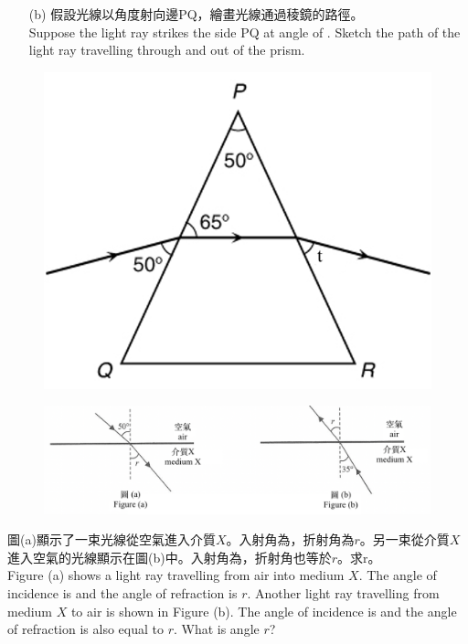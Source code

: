 \documentclass[beamer=true]{standalone}
\begin{document}
\begin{eg}
    \begin{itemize}
        \item [(b)] 假設光線以角度射向邊PQ，繪畫光線通過稜鏡的路徑。\\Suppose the light ray strikes the side PQ at angle of . Sketch the path of the light ray travelling through and out of the prism.
    \end{itemize}
    \begin{figure}
        \centering
        \includegraphics[width=0.6\linewidth]{assets/9209138209312.png}
        
        
    \end{figure}
\end{eg}

\begin{eg}
    \begin{figure}
        \centering
        \includegraphics[width=1\linewidth]{assets/212109281938.png}
    \end{figure}
    圖(a)顯示了一束光線從空氣進入介質$X$。入射角為，折射角為$r$。另一束從介質$X$進入空氣的光線顯示在圖(b)中。入射角為，折射角也等於$r$。求r。\\Figure (a) shows a light ray travelling from air into medium $X$. The angle of incidence is  and the angle of refraction is $r$. Another light ray travelling from medium $X$ to air is shown in Figure (b). The angle of incidence is  and the angle of refraction is also equal to $r$. What is angle $r$?
\end{eg}
\end{document}
